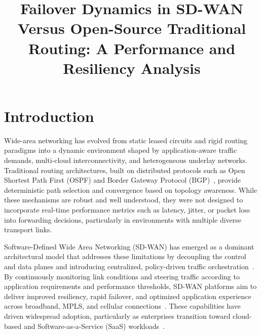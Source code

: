 \documentclass[conference]{IEEEtran}
\begin{document}
\title{Failover Dynamics in SD-WAN Versus Open-Source Traditional Routing: A Performance and Resiliency Analysis}

\author{
}

\maketitle

\section{Introduction}

Wide-area networking has evolved from static leased circuits and rigid routing paradigms into a dynamic environment shaped by application-aware traffic demands, multi-cloud interconnectivity, and heterogeneous underlay networks. Traditional routing architectures, built on distributed protocols such as Open Shortest Path First (OSPF) and Border Gateway Protocol (BGP)~\cite{rfc2328, rfc4271}, provide deterministic path selection and convergence based on topology awareness. While these mechanisms are robust and well understood, they were not designed to incorporate real-time performance metrics such as latency, jitter, or packet loss into forwarding decisions, particularly in environments with multiple diverse transport links.

Software-Defined Wide Area Networking (SD-WAN) has emerged as a dominant architectural model that addresses these limitations by decoupling the control and data planes and introducing centralized, policy-driven traffic orchestration~\cite{cisco_sdwanoverview}. By continuously monitoring link conditions and steering traffic according to application requirements and performance thresholds, SD-WAN platforms aim to deliver improved resiliency, rapid failover, and optimized application experience across broadband, MPLS, and cellular connections~\cite{techtarget2023wancomparison, fortinet_securesdwan}. These capabilities have driven widespread adoption, particularly as enterprises transition toward cloud-based and Software-as-a-Service (SaaS) workloads~\cite{gartner_sdwanguide}.
\end{document}
